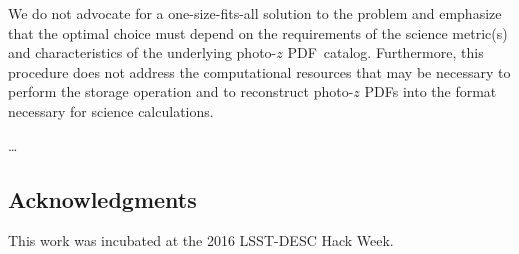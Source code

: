 \documentclass[\docopts]{\docclass}
\newcommand{\pz}{photo-$z$ PDF}
\begin{document}
We do not advocate for a one-size-fits-all solution to the problem and 
emphasize that the optimal choice must depend on the requirements of the 
science metric(s) and characteristics of the underlying \pz\ catalog.  
Furthermore, this procedure does not address the computational resources that 
may be necessary to perform the storage operation and to reconstruct \pz s into 
the format necessary for science calculations.

\dots


\subsection*{Acknowledgments}


This work was incubated at the 2016 LSST-DESC Hack Week.







\end{document}
